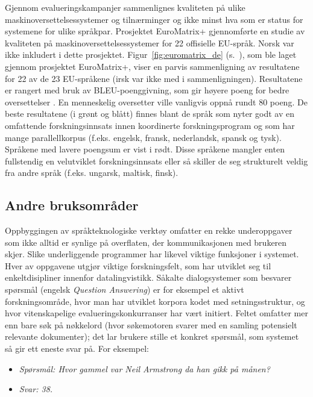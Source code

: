 \begin{multicols}{2}
Gjennom evalueringskampanjer sammenlignes kvaliteten på ulike maskinoversettelsessystemer og tilnærminger og ikke minst hva som er status for systemene for ulike språkpar.
Prosjektet EuroMatrix+ gjennomførte en studie av kvaliteten på maskinoversettelsessystemer for 22 offisielle EU-språk. Norsk var ikke inkludert i dette prosjektet.
Figur~\ref{fig:euromatrix_de} (s.~\pageref{fig:euromatrix_de}), som ble laget gjennom prosjektet EuroMatrix+, viser en parvis sammenligning av resultatene for 22 av de 23 EU-språkene (irsk var ikke med i sammenligningen). Resultatene er rangert med bruk av BLEU-poenggivning, som gir høyere poeng for bedre oversettelser \cite{bleu1}. En menneskelig oversetter ville vanligvis oppnå rundt 80 poeng. De beste resultatene (i grønt og blått) finnes blant de språk som nyter godt av en omfattende forskningsinnsats innen koordinerte forskningsprogram og som har mange parallellkorpus (f.eks. engelsk, fransk, nederlandsk, spansk og tysk). Språkene med lavere poengsum er vist i rødt. Disse språkene mangler enten fullstendig en velutviklet forskningsinnsats eller så skiller de seg strukturelt veldig fra andre språk (f.eks. ungarsk, maltisk, finsk).  

\subsection{Andre bruksområder}

Oppbyggingen av språkteknologiske verktøy omfatter en rekke underoppgaver som ikke alltid er synlige på overflaten, der kommunikasjonen med brukeren skjer. Slike underliggende programmer har likevel viktige funksjoner i systemet. Hver av oppgavene utgjør viktige forskningsfelt, som har utviklet seg til enkeltdisipliner innenfor datalingvistikk. Såkalte dialogsystemer som besvarer spørsmål (engelsk \textit{Question Answering}) er for eksempel et aktivt forskningsområde, hvor man har utviklet korpora kodet med setningsstruktur, og hvor vitenskapelige evalueringskonkurranser har vært initiert. Feltet omfatter mer enn bare søk på nøkkelord (hvor søkemotoren svarer med en samling potensielt relevante dokumenter); det lar brukere stille et konkret spørsmål, som systemet så gir ett eneste svar på. For eksempel:

\begin{itemize}
\item[] \textit{Spørsmål: Hvor gammel var Neil Armstrong da han gikk på månen?}
\item[] \textit{Svar: 38.}
\end{itemize}


\end{multicols}
